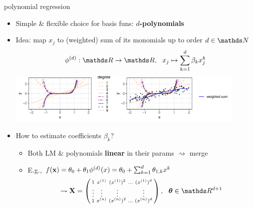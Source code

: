 \documentclass[11pt,compress,t,notes=noshow, xcolor=table]{beamer}
\begin{document}
\begin{frame}{polynomial regression}

\begin{itemize}
    \item Simple \& flexible choice for basis funs: \textbf{$d$-polynomials}
    \item Idea: map $x_j$ to (weighted) sum of its monomials up to order
    $d \in \N$
    $$ \phi^{(d)}: \R \rightarrow \R, ~~
    x_j \mapsto \sum_{k = 1}^d \beta_k x_j^k$$
    \includegraphics[width=0.9\textwidth]{figure/reg_poly_basis}
    \item How to estimate coefficients $\beta_k$?
    \begin{itemize}
      \item Both LM \& polynomials \textbf{linear} in their params
      $\rightsquigarrow$ merge
      \item E.g.,
      $f(\mathbf{x}) = \theta_0 + \theta_1 \phi^{(d)}(x)  =
      \theta_0 + \sum_{k = 1}^d \theta_{1, k} x^k$
      $$\rightsquigarrow \Xmat = \left(
      \begin{smallmatrix}
          1 & x^{(1)} & (x^{(1)})^2 & \hdots & (x^{(1)})^d \\
          \vdots & \vdots & \vdots & & \vdots \\
          1 & x^{(n)} & (x^{(n)})^2 & \hdots & (x^{(n)})^d \\
      \end{smallmatrix}
      \right),
      ~~ \thetab \in \R^{d + 1}
      $$
    \end{itemize}
\end{itemize}

\end{frame}

\end{document}
